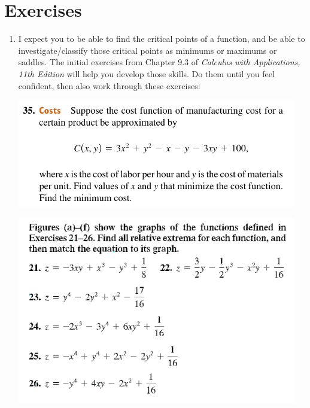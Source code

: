 \newpage

\section*{Exercises}

\begin{enumerate}
    \item %
        I expect you to be able to find the critical points of a function,
        and be able to investigate/classify those critical points
        as minimums or maximums or saddles.
        The initial exercises from Chapter 9.3 of 
        \emph{Calculus with Applications, 11th Edition}
        will help you develop those skills.
        Do them until you feel confident, 
        then also work through these exercises:
        \begin{center}
            \includegraphics[width=0.96\textwidth]{screenshots/35.png}
        \end{center}
        \begin{center}
            \includegraphics[width=0.96\textwidth]{screenshots/21-1.png}

\end{center}
\end{enumerate}
